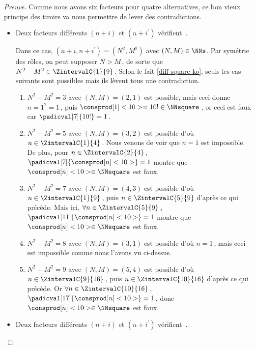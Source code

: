 \begin{proof}[Preuve]
    \medskip
    
    Comme nous avons six facteurs pour quatre alternatives, ce bon vieux principe des tiroirs va nous permettre de lever des contradictions.
    \begin{itemize}
    	\medskip
		\item Deux facteurs différents $(n+i)$ et $(n+i^\prime)$ vérifient \,.
		
		\smallskip
		\noindent
		Dans ce cas, $(n+i, n+i^\prime) = (N^2, M^2)$ avec $(N, M) \in \NNs$.
		Par symétrie des rôles, on peut supposer $N > M$\,, de sorte que $N^2 - M^2 \in \ZintervalC{1}{9}$\,. 
		Selon le fait \ref{diff-square-ko}, seuls les cas suivants sont possibles mais ils lèvent tous une contradiction.
		\begin{enumerate}
			\item $N^2 - M^2 = 3$ avec $(N, M) = (2, 1)$ est possible, mais ceci donne $n = 1^2 = 1$\,, puis $\consprod[1]<10> = 10 ! \in \NNsquare$\,, or ceci est faux car $\padicval[7]{10!} = 1$\,.


			\item $N^2 - M^2 = 5$ avec $(N, M) = (3, 2)$ est possible
			d'où $n \in \ZintervalC{1}{4}$\,.
			Nous venons de voir que $n = 1$ est impossible.
			De plus, pour $n \in \ZintervalC{2}{4}$\,, $\padicval[7]{\consprod[n]<10>} = 1$ montre que $\consprod[n]<10> \in \NNsquare$ est faux.
			

			\item $N^2 - M^2 = 7$ avec $(N, M) = (4, 3)$ est possible
			d'où $n \in \ZintervalC{1}{9}$\,, puis $n \in \ZintervalC{5}{9}$ d'après ce qui précède.
			Mais ici, $\forall n \in \ZintervalC{5}{9}$\,, $\padicval[11]{\consprod[n]<10>} = 1$ montre que $\consprod[n]<10> \in \NNsquare$ est faux.


			\item $N^2 - M^2 = 8$ avec $(N, M) = (3, 1)$ est possible
			d'où $n = 1$\,, mais ceci est impossible comme nous l'avons vu ci-dessus.


			\item $N^2 - M^2 = 9$ avec $(N, M) = (5, 4)$ est possible
			d'où $n \in \ZintervalC{9}{16}$\,, puis $n \in \ZintervalC{10}{16}$ d'après ce qui précède.
			Or $\forall n \in \ZintervalC{10}{16}$\,, $\padicval[17]{\consprod[n]<10>} = 1$\,, donc $\consprod[n]<10> \in \NNsquare$ est faux.
		\end{enumerate}


    	\medskip
		\item Deux facteurs différents $(n+i)$ et $(n+i^\prime)$ vérifient \,.
		

\end{itemize}
\end{proof}
